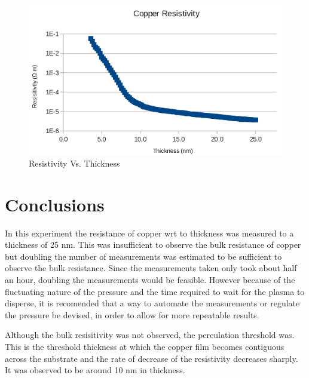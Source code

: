 \documentclass[aps,prl,twocolumn,groupedaddress,showkeys]{revtex4}
\begin{document}
\begin{figure}[h]
	\includegraphics[width=\linewidth]{copperResistivity.png}
	\caption{Resistivity Vs. Thickness}
	\label{fig:copperResistivity}
\end{figure}

\section{Conclusions}

In this experiment the resistance of copper wrt to thickness was measured to a thickness of 25 nm. This was insufficient to observe the bulk resistance of copper but doubling the number of measurements was estimated to be sufficient to observe the bulk resistance. Since the measurements taken only took about half an hour, doubling the measurements would be feasible. However because of the fluctuating nature of the pressure and the time required to wait for the plasma to disperse, it is recomended that a way to automate the measurements or regulate the pressure be devised, in order to allow for more repeatable results.

Although the bulk resisitivity was not observed, the perculation threshold was. This is the threshold thickness at which the copper film becomes contiguous across the substrate and the rate of decrease of the resistivity decreases sharply. It was observed to be around 10 nm in thickness.



\end{document}

